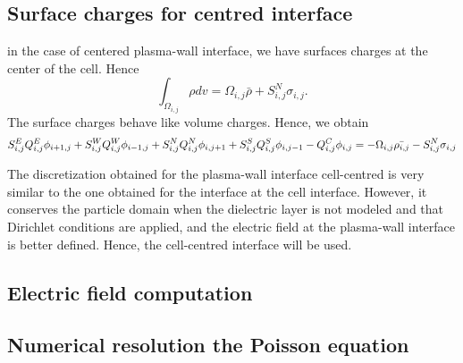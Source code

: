   \subsection{Surface charges for centred interface}
    in the case of centered plasma-wall interface, we have surfaces charges at the center of the cell.
    Hence
    \begin{equation}
    \int_{\Omega_{i,j}} \rho dv = \Omega_{i,j}\bar{\rho} + S_{i,j}^N \sigma_{i,j}.
    \end{equation}
    The surface charges behave like volume charges.
    Hence, we obtain
    \begin{equation}
    S^E_{i,j} Q^E_{i,j} \phi_{i+1,j} + S^W_{i,j} Q^W_{i,j} \phi_{i-1,j} + S^N_{i,j} Q^N_{i,j} \phi_{i,j+1} + S^S_{i,j} Q^S_{i,j} \phi_{i,j-1} - Q^C_{i,j} \phi_{i,j} = - \Omega_{i,j} \bar{\rho_{i,j}} - S^N_{i,j} \sigma_{i,j}
    \end{equation}

    The discretization obtained for the plasma-wall interface cell-centred is very similar to the one obtained for the interface at the cell interface.
    However, it conserves the particle domain when the dielectric layer is not modeled and that Dirichlet conditions are applied, and the electric field at the plasma-wall interface is better defined.
    Hence, the cell-centred interface will be used.

  \subsection{Electric field computation}
  
  \subsection{Numerical resolution the Poisson equation}
  
  